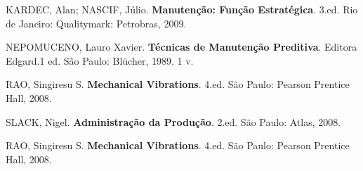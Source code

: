 \documentclass[
	12pt,				
	oneside,			
	a4paper,			
	english,			
	brazil				
	]{abntex2ppgsi}
\begin{document}
\postextual


%


\begin{thebibliography}{9}

  KARDEC, Alan; NASCIF, Júlio.
  \textbf{Manutenção: Função Estratégica}.
  3.ed. Rio de Janeiro: Qualitymark: Petrobras, 2009.

 NEPOMUCENO, Lauro Xavier.
  \textbf{Técnicas de Manutenção Preditiva}.
  Editora Edgard.1 ed. São Paulo: Blücher, 1989. 1 v.

 RAO, Singiresu S.
  \textbf{Mechanical Vibrations}.
  4.ed. São Paulo: Pearson Prentice Hall, 2008.
  
 SLACK, Nigel.
  \textbf{Administração da Produção}.
  2.ed. São Paulo: Atlas, 2008.
 
 RAO, Singiresu S.
  \textbf{Mechanical Vibrations}.
  4.ed. São Paulo: Pearson Prentice Hall, 2008.

  

\end{thebibliography}


%
%






\begin{anexosenv}


\end{anexosenv}
\end{document}
